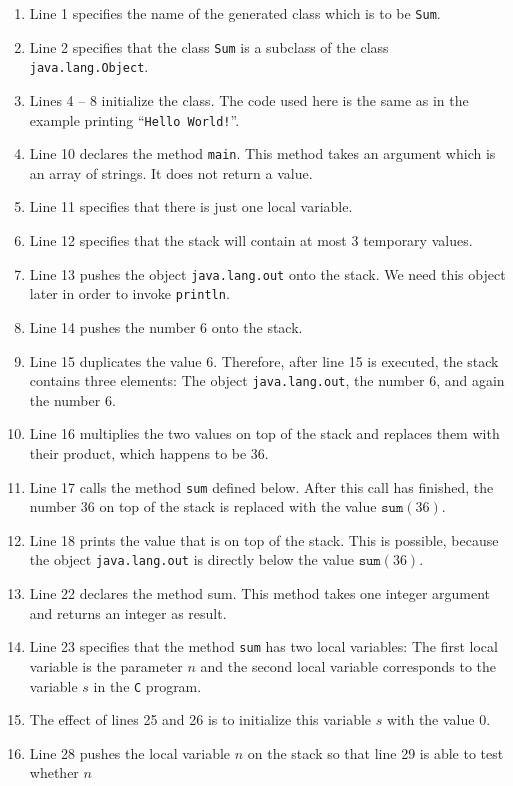 \begin{enumerate}
\item Line 1 specifies the name of the generated class which is to be \texttt{Sum}.
\item Line 2 specifies that the class \texttt{Sum} is a subclass of the class
      \texttt{java.lang.Object}. 
\item Lines 4 -- 8 initialize the class.  The code used here is the same as in the example printing 
      ``\texttt{Hello World!}''.
\item Line 10 declares the method \texttt{main}.  This method takes an argument which is an array of strings.
      It does not return a value.
\item Line 11 specifies that there is just one local variable.
\item Line 12 specifies that the stack will contain at most 3 temporary values.
\item Line 13 pushes the object \texttt{java.lang.out} onto the stack.
      We need this object later in order to invoke \texttt{println}.
\item Line 14 pushes the number 6 onto the stack.
\item Line 15 duplicates the value 6.  Therefore, after line 15 is executed, the stack contains three
      elements: The object \texttt{java.lang.out},  the number 6, and again the number 6.
\item Line 16 multiplies the two values on top of the stack and replaces them with their product,
      which happens to be 36.
\item Line 17 calls the method \texttt{sum} defined below.  After this call has finished, the number 
      36 on top of the stack is replaced with the value $\mathtt{sum}(36)$.
\item Line 18 prints the value that is on top of the stack.
      This is possible, because the object \texttt{java.lang.out} is directly below the value
      $\texttt{sum}(36)$.
\item Line 22 declares the method sum.  This method takes one integer argument and returns an
      integer as result. 
\item Line 23 specifies that the method \texttt{sum} has two local variables: The first local
      variable is the parameter $n$ and the second local variable corresponds to the variable $s$ in the
      \texttt{C} program.
\item The effect of lines 25 and 26 is to initialize this variable $s$ with the value $0$.
\item Line 28 pushes the local variable $n$ on the stack so that line 29 is able to test whether $n$

\end{enumerate}
